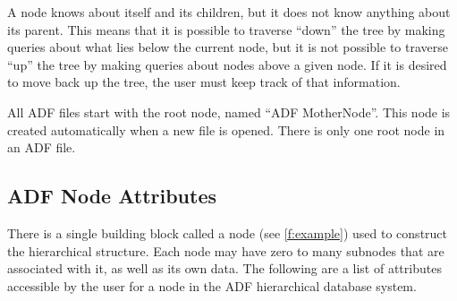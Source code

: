 A node knows about itself and its children, but it does not know
anything about its parent.
This means that it is possible to traverse ``down'' the tree by making
queries about what lies below the current node, but it is not possible
to traverse ``up'' the tree by making queries about nodes above a given
node.
If it is desired to move back up the tree, the user must keep track of
that information.

All ADF files start with the root node, named ``ADF MotherNode''.
This node is created automatically when a new file is opened.
There is only one root node in an ADF file.

\subsection{ADF Node Attributes}
\label{s:node}

There is a single building block called a node (see \autoref{f:example})
used to construct the hierarchical structure.
Each node may have zero to many subnodes that are associated with it, as
well as its own data.
The following are a list of attributes accessible by the user for a node
in the ADF hierarchical database system.

